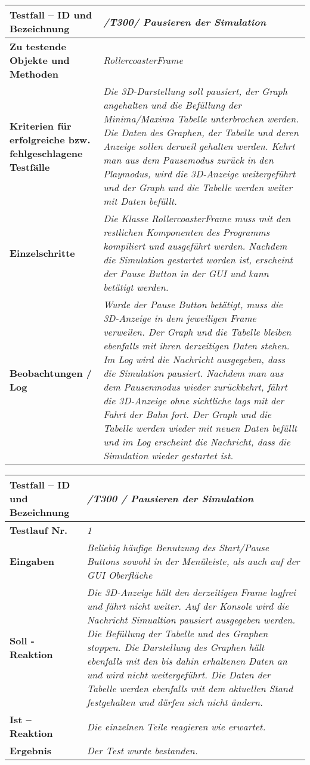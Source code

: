 \begin{longtable}{|p{7cm}|p{10cm}|}
\hline
\textbf{Testfall -- ID und Bezeichnung} &  \textit{/T300/ Pausieren der Simulation} \\
\hline
\textbf{Zu testende Objekte und Methoden} &  \textit{RollercoasterFrame}
\\
\hline
\textbf{Kriterien für erfolgreiche bzw. fehlgeschlagene Testfälle} &
\textit{Die 3D-Darstellung soll pausiert, der Graph angehalten und die Befüllung der Minima/Maxima Tabelle unterbrochen werden. Die Daten des Graphen, der Tabelle und deren Anzeige sollen
derweil gehalten werden. Kehrt man aus dem Pausemodus zurück in den Playmodus, wird die 3D-Anzeige weitergeführt und der Graph und die Tabelle werden weiter mit Daten befüllt.} \\
\hline
\textbf{Einzelschritte} &  \textit{Die Klasse RollercoasterFrame muss mit den restlichen Komponenten des Programms kompiliert und ausgeführt werden. Nachdem die Simulation gestartet worden ist,
erscheint der Pause Button in der GUI und kann betätigt werden.} \\
\hline
\textbf{Beobachtungen / Log} &  \textit{Wurde der Pause Button betätigt, muss die 3D-Anzeige in dem jeweiligen Frame verweilen. Der Graph und die Tabelle bleiben ebenfalls mit ihren derzeitigen
Daten stehen. Im Log wird die Nachricht ausgegeben, dass die Simulation pausiert. Nachdem man aus dem Pausenmodus wieder zurückkehrt, fährt die 3D-Anzeige ohne sichtliche lags mit der Fahrt 
der Bahn fort. Der Graph und die Tabelle werden wieder mit neuen Daten befüllt und im Log erscheint die Nachricht, dass die Simulation wieder gestartet ist. } \\
\hline
\end{longtable}

\begin{longtable}{|p{7cm}|p{10cm}|}
\hline
\textbf{Testfall -- ID und Bezeichnung} & \textit{ /T300 / Pausieren der Simulation} \\
\hline
\textbf{Testlauf Nr.} & \textit{1} \\
\hline
\textbf{Eingaben} & \textit{Beliebig häufige Benutzung des Start/Pause Buttons sowohl in der Menüleiste, als auch auf der GUI Oberfläche} \\
\hline
\textbf{Soll - Reaktion} & \textit{Die 3D-Anzeige hält den derzeitigen Frame lagfrei und fährt nicht weiter. Auf der Konsole wird die Nachricht Simualtion pausiert ausgegeben werden. 
Die Befüllung der Tabelle und des Graphen stoppen. Die Darstellung des Graphen hält ebenfalls mit den bis dahin erhaltenen Daten an und wird nicht weitergeführt. Die Daten der Tabelle werden 
ebenfalls mit dem aktuellen Stand festgehalten und dürfen sich nicht ändern.} \\
\hline
\textbf{Ist -- Reaktion} & \textit{Die einzelnen Teile reagieren wie erwartet.} \\
\hline
\textbf{Ergebnis} & \textit{Der Test wurde bestanden.} \\
\hline
\end{longtable}

